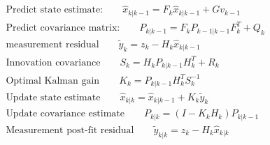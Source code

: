 \begin{align}
&\textrm{Predict state estimate:} \qquad \hat{x}_{k|k-1}=F_k\hat{x}_{k|k-1}+Gv_{k-1}\\
&\textrm{Predict covariance matrix:}\qquad P_{k|k-1}=F_{k}P_{k-1|k-1}F^T_{k}+Q_{k}\\
\label{eq.measurement}
&\textrm{measurement residual}\qquad \tilde{y}_k=z_k-H_k\hat{x}_{k|k-1}\\
&\textrm{Innovation covariance}\qquad S_k=H_kP_{k|k-1}H_k^T+R_k \\
&\textrm{Optimal Kalman gain}\qquad K_k=P_{k|k-1}H_k^TS_k^{-1}\\
\label{eq.Update}
&\textrm{Update state estimate}\qquad \hat{x}_{k|k}=\hat{x}_{k|k-1}+K_k\tilde{y}_k\\
&\textrm{Update covariance estimate}\qquad P_{k|k}=(I-K_kH_k)P_{k|k-1}\\
&\textrm{Measurement post-fit residual} \qquad \tilde{y}_{k|k}=z_k-H_k\hat{x}_{k|k}
\end{align}